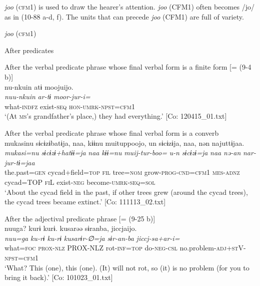 \textit{joo} (\textsc{cfm}1) is used to draw the hearer’s attention. \textit{joo} (CFM1) often becomes /jo/ as in (10-88 a-d, f). The units that can precede \textit{joo} (CFM1) are full of variety.

\ea\label{ex:10.88}   \textit{joo} (\textsc{cfm}1)\\
    \begin{xlist}
  \exi{} After predicates

  \ex  After the verbal predicate phrase whose final verbal form is a finite form [= (9-4 b)]\\
      \glll    nu-nkuin  atɨ  moojuijo.\\
      \textit{nuu-nkuin}  \textit{ar-tɨ}  \textit{moor-jur-i=}\\
      what-\textsc{indfz}  exist-\textsc{seq}  \textsc{hon}-\textsc{umrk}-\textsc{npst}=\textsc{cfm}1\\
      \glt       ‘(At \textsc{ms}’s grandfather’s place,) they had everything.’ [Co: 120415\_01.txt]

  \ex After the verbal predicate phrase whose final verbal form is a converb\\
      \glll    mukasinu  sɨcɨzɨbatɨja,  naa,  kɨɨnu  muituppoojo,  un  sɨcɨzɨja,  naa,  nən  najuttɨjaa.\\
      \textit{mukasi=nu}  \textit{sɨcɨzɨ+hatɨɨ=ja}  \textit{naa}  \textit{kɨɨ=nu}  \textit{muij-tur-boo=}     \textit{u-n}  \textit{sɨcɨzɨ=ja}  \textit{naa}  \textit{nə-an}  \textit{nar-jur-tɨ=jaa}\\
      the.past=\textsc{gen}  cycad+field=\textsc{top}  \textsc{fil}  tree=\textsc{nom}  grow-\textsc{prog}-\textsc{cnd}=\textsc{cfm}1  \textsc{mes}-\textsc{adnz}  cycad=TOP  \textsc{fi}L  exist-\textsc{neg}  become-\textsc{umrk}-\textsc{seq}=\textsc{sol}\\
      \glt       ‘About the cycad field in the past, if other trees grew (around the cycad trees), the cycad trees became extinct.’ [Co: 111113\_02.txt]

   \ex  After the adjectival predicate phrase [= (9-25 b)]\\
      \glll    nuuga?  kurɨ  kurɨ.  kusarəə  sɨranba,  jiccjaijo.\\
      \textit{nuu=ga}  \textit{ku-rɨ}  \textit{ku-rɨ}  \textit{kusarɨr-∅=ja}  \textit{sɨr-an-ba}  \textit{jiccj-sa+ar-i=}\\
      what=\textsc{foc}  \textsc{prox}-\textsc{nlz}  PROX-NLZ  rot-\textsc{inf}=\textsc{top}  do-\textsc{neg}-\textsc{csl}  no.problem-\textsc{adj}+\textsc{st}V-\textsc{npst}=\textsc{cfm}1\\
      \glt       ‘What? This (one), this (one). (It) will not rot, so (it) is no problem (for you to bring it back).’ [Co: 101023\_01.txt]


\end{xlist}
